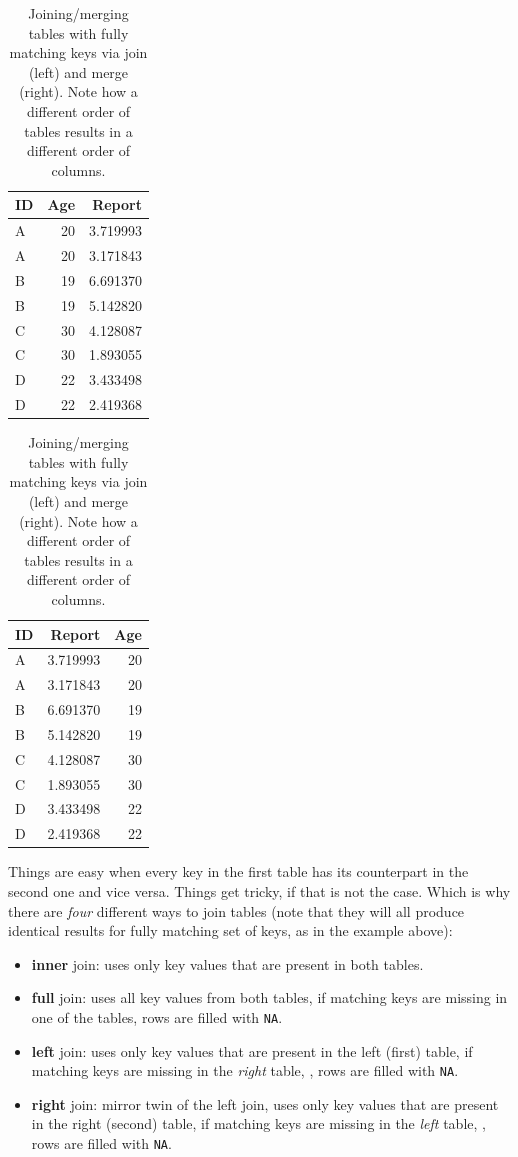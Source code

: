 \documentclass[
]{book}
\providecommand{\tightlist}{%
  \setlength{\itemsep}{0pt}\setlength{\parskip}{0pt}}
\begin{document}
\begin{table}
\caption{\label{tab:unnamed-chunk-185}Joining/merging tables with fully matching keys via join (left) and merge (right). Note how a different order of tables results in a different order of columns.}

\centering
\begin{tabular}[t]{l|r|r}
\hline
ID & Age & Report\\
\hline
A & 20 & 3.719993\\
\hline
A & 20 & 3.171843\\
\hline
B & 19 & 6.691370\\
\hline
B & 19 & 5.142820\\
\hline
C & 30 & 4.128087\\
\hline
C & 30 & 1.893055\\
\hline
D & 22 & 3.433498\\
\hline
D & 22 & 2.419368\\
\hline
\end{tabular}
\centering
\begin{tabular}[t]{l|r|r}
\hline
ID & Report & Age\\
\hline
A & 3.719993 & 20\\
\hline
A & 3.171843 & 20\\
\hline
B & 6.691370 & 19\\
\hline
B & 5.142820 & 19\\
\hline
C & 4.128087 & 30\\
\hline
C & 1.893055 & 30\\
\hline
D & 3.433498 & 22\\
\hline
D & 2.419368 & 22\\
\hline
\end{tabular}
\end{table}

Things are easy when every key in the first table has its counterpart in the second one and vice versa. Things get tricky, if that is not the case. Which is why there are \emph{four} different ways to join tables (note that they will all produce identical results for fully matching set of keys, as in the example above):

\begin{itemize}
\tightlist
\item
  \textbf{inner} join: uses only key values that are present in both tables.
\item
  \textbf{full} join: uses all key values from both tables, if matching keys are missing in one of the tables, rows are filled with \texttt{NA}.
\item
  \textbf{left} join: uses only key values that are present in the left (first) table, if matching keys are missing in the \emph{right} table, , rows are filled with \texttt{NA}.
\item
  \textbf{right} join: mirror twin of the left join, uses only key values that are present in the right (second) table, if matching keys are missing in the \emph{left} table, , rows are filled with \texttt{NA}.
\end{itemize}
\end{document}
